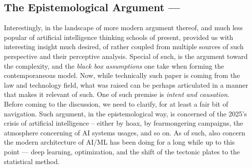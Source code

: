 \subsection{The Epistemological Argument --- \cite{Bathaee2018TheAI}}
Interestingly, in the landscape of more modern argument thereof, and much less popular of artificial intelligence thinking schools of present, \cite{Bathaee2018TheAI} provided us with interesting insight much desired, of rather coupled from multiple sources of such perspective and their perceptive analysis. Special of such, is the argument toward the complexity, and the \textit{black box assumptions} one take when forming the contemporaneous model. Now, while technically such paper is coming from the law and technology field, what was raised can be perhaps articulated in a manner that makes it relevant of such. One of such premise is \textit{intent and causation}. Before coming to the discussion, we need to clarify, for at least a fair bit of navigation. Such argument, in the epistemological way, is concerned of the 2025's crisis of artificial intelligence -- either by hoax, by fearmongering campaigns, the atmosphere concerning of AI systems usages, and so on. As of such, also concern the modern architecture of AI/ML has been doing for a long while up to this point --- deep learning, optimization, and the shift of the tectonic plates to the statistical method.

